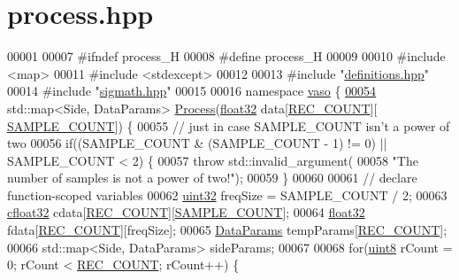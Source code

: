 \hypertarget{process_8hpp_source}{\section{process.\+hpp}
\label{process_8hpp_source}
}

\begin{DoxyCode}
00001 
00007 \textcolor{preprocessor}{#ifndef process\_H}
00008 \textcolor{preprocessor}{#define process\_H}
00009 
00010 \textcolor{preprocessor}{#include <map>}
00011 \textcolor{preprocessor}{#include <stdexcept>}
00012 
00013 \textcolor{preprocessor}{#include "\hyperlink{definitions_8hpp}{definitions.hpp}"}
00014 \textcolor{preprocessor}{#include "\hyperlink{sigmath_8hpp}{sigmath.hpp}"}
00015 
00016 \textcolor{keyword}{namespace }\hyperlink{namespacevaso}{vaso} \{    
\hypertarget{process_8hpp_source_l00054}{}\hyperlink{namespacevaso_a852067e19b0bcfebb4fa6674c7c8d67f}{00054}     std::map<Side, DataParams> \hyperlink{namespacevaso_a852067e19b0bcfebb4fa6674c7c8d67f}{Process}(\hyperlink{definitions_8hpp_aacdc525d6f7bddb3ae95d5c311bd06a1}{float32} data[\hyperlink{definitions_8hpp_aa44e6143be9e89f19be973956c22e134}{REC\_COUNT}][
      \hyperlink{definitions_8hpp_a1682c770d91c5d167b621a782be940d4}{SAMPLE\_COUNT}]) \{
00055         \textcolor{comment}{// just in case SAMPLE\_COUNT isn't a power of two}
00056         \textcolor{keywordflow}{if}((SAMPLE\_COUNT & (SAMPLE\_COUNT - 1) != 0) || SAMPLE\_COUNT < 2) \{
00057             \textcolor{keywordflow}{throw} std::invalid\_argument(
00058                     \textcolor{stringliteral}{"The number of samples is not a power of two!"});
00059         \}
00060 
00061         \textcolor{comment}{// declare function-scoped variables}
00062         \hyperlink{definitions_8hpp_a1134b580f8da4de94ca6b1de4d37975e}{uint32} freqSize = SAMPLE\_COUNT / 2;
00063         \hyperlink{definitions_8hpp_a960be6b6614c08090c16574dba10a421}{cfloat32} cdata[\hyperlink{definitions_8hpp_aa44e6143be9e89f19be973956c22e134}{REC\_COUNT}][\hyperlink{definitions_8hpp_a1682c770d91c5d167b621a782be940d4}{SAMPLE\_COUNT}];
00064         \hyperlink{definitions_8hpp_aacdc525d6f7bddb3ae95d5c311bd06a1}{float32} fdata[\hyperlink{definitions_8hpp_aa44e6143be9e89f19be973956c22e134}{REC\_COUNT}][freqSize];
00065         \hyperlink{structDataParams}{DataParams} tempParams[\hyperlink{definitions_8hpp_aa44e6143be9e89f19be973956c22e134}{REC\_COUNT}];
00066         std::map<Side, DataParams> sideParams;
00067 
00068         \textcolor{keywordflow}{for}(\hyperlink{definitions_8hpp_adde6aaee8457bee49c2a92621fe22b79}{uint8} rCount = 0; rCount < \hyperlink{definitions_8hpp_aa44e6143be9e89f19be973956c22e134}{REC\_COUNT}; rCount++) \{

\end{DoxyCode}
